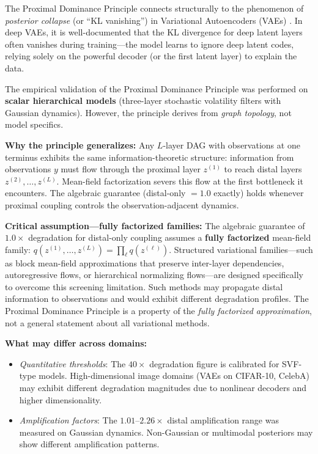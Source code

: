\documentclass[10pt]{article} %
\theoremstyle{plain}
\theoremstyle{definition}
\begin{document}
The Proximal Dominance Principle connects structurally to the phenomenon of \emph{posterior collapse} (or ``KL vanishing'') in Variational Autoencoders (VAEs) \citep{bowman2016generating,alemi2018fixing,he2019lagging,lucas2019understanding}. In deep VAEs, it is well-documented that the KL divergence for deep latent layers often vanishes during training---the model learns to ignore deep latent codes, relying solely on the powerful decoder (or the first latent layer) to explain the data.

\begin{tcolorbox}[breakable, colback=gray!5, colframe=black!75, title=\textbf{Empirical Scope and Topological Generality}, fonttitle=\bfseries]
The empirical validation of the Proximal Dominance Principle was performed on \textbf{scalar hierarchical models} (three-layer stochastic volatility filters with Gaussian dynamics). However, the principle derives from \emph{graph topology}, not model specifics.

\textbf{Why the principle generalizes:} Any $L$-layer DAG with observations at one terminus exhibits the same information-theoretic structure: information from observations $y$ must flow through the proximal layer $z^{(1)}$ to reach distal layers $z^{(2)}, \ldots, z^{(L)}$. Mean-field factorization severs this flow at the first bottleneck it encounters. The algebraic guarantee (distal-only $= 1.0$ exactly) holds whenever proximal coupling controls the observation-adjacent dynamics.

\textbf{Critical assumption---fully factorized families:} The algebraic guarantee of $1.0\times$ degradation for distal-only coupling assumes a \textbf{fully factorized} mean-field family: $q(z^{(1)}, \ldots, z^{(L)}) = \prod_{\ell} q(z^{(\ell)})$. Structured variational families---such as block mean-field approximations that preserve inter-layer dependencies, autoregressive flows, or hierarchical normalizing flows---are designed specifically to overcome this screening limitation. Such methods may propagate distal information to observations and would exhibit different degradation profiles. The Proximal Dominance Principle is a property of the \emph{fully factorized approximation}, not a general statement about all variational methods.

\textbf{What may differ across domains:}
\begin{itemize}
    \item \emph{Quantitative thresholds}: The $40\times$ degradation figure is calibrated for SVF-type models. High-dimensional image domains (VAEs on CIFAR-10, CelebA) may exhibit different degradation magnitudes due to nonlinear decoders and higher dimensionality.
    \item \emph{Amplification factors}: The $1.01$--$2.26\times$ distal amplification range was measured on Gaussian dynamics. Non-Gaussian or multimodal posteriors may show different amplification patterns.
\end{itemize}


\end{tcolorbox}
\end{document}
